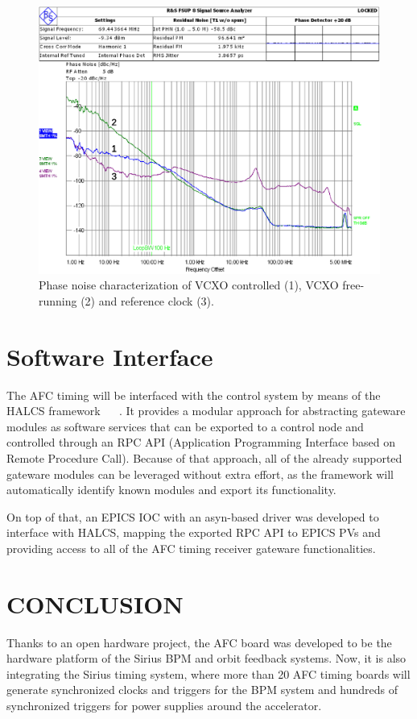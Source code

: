 \documentclass[a4paper,
               biblatex,      %
               ]{jacow}
\begin{document}
\begin{figure}[!htb]
   \centering
   \includegraphics*[width=0.9\columnwidth]{Phase_noise}
   \caption{Phase noise characterization of VCXO controlled (1), VCXO free-running (2) and reference clock (3).}
   \label{fig:AFCPhaseNoise}
\end{figure}

\section{Software Interface}
The AFC timing will be interfaced with the control system by means of the HALCS framework ~\cite{halcs_pcapac16} ~\cite{halcs_icalepcs17}. It provides a modular approach for abstracting gateware modules as software services that can be exported to a control node and controlled through an RPC API (Application Programming Interface based on Remote Procedure Call). Because of that approach, all of the already supported gateware modules can be leveraged without extra effort, as the framework will automatically identify known modules and export its functionality.

On top of that, an EPICS IOC with an asyn-based driver was developed to interface with HALCS, mapping the exported RPC API to EPICS PVs and providing access to all of the AFC timing receiver gateware functionalities.

\section{CONCLUSION}
Thanks to an open hardware project, the AFC board was developed to be the hardware platform of the Sirius BPM and orbit feedback systems. Now, it is also integrating the Sirius timing system, where more than 20 AFC timing boards will generate synchronized clocks and triggers for the BPM system and hundreds of synchronized triggers for power supplies around the accelerator.
\end{document}
